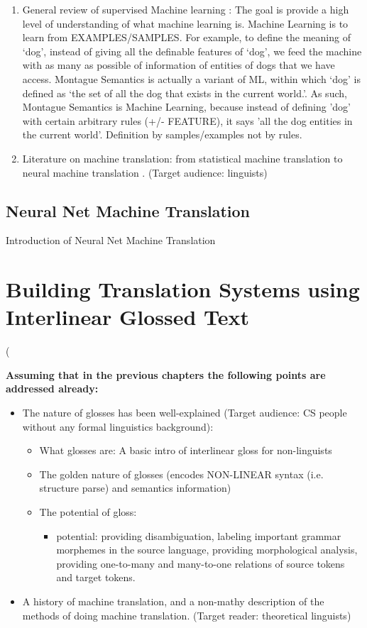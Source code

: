 \documentclass[final]{ua-thesis}
\numberwithin{equation}{section}
\begin{document}
	\begin{enumerate}
	\item General review of supervised Machine learning \citep{kotsiantis2007supervised}: The goal is provide a high level of understanding of what machine learning is. Machine Learning is to learn from EXAMPLES/SAMPLES. For example, to define the meaning of `dog', instead of giving all the definable features of `dog', we feed the machine with as many as possible of information of entities of dogs that we have access. Montague Semantics is actually a variant of ML, within which `dog' is defined as `the set of all the dog that exists in the current world.'. As such, Montague Semantics is Machine Learning, because instead of defining 'dog' with certain arbitrary rules (+/- FEATURE), it says 'all the dog entities in the current world'. Definition by samples/examples not by rules.    
	\item Literature on machine translation: from statistical machine translation \citep{koehn2009statistical} to neural machine translation \citep{cho2014learning,cho2014properties,bahdanau2014neural,Koehn_NMT2017}. (Target audience: linguists)
	\end{enumerate}
 
\section{Neural Net Machine Translation}\label{neural_MT}
Introduction of Neural Net Machine Translation
\chapter{Building Translation Systems using Interlinear Glossed Text}
\label{chap:cake}

(

\textbf{Assuming that in the previous chapters the following points are addressed already:}
\begin{itemize}
\item The nature of glosses has been well-explained  (Target audience: CS people without any formal linguistics background):
	\begin{itemize}
	\item What glosses are: A basic intro of interlinear gloss for non-linguists
   \item The golden nature of glosses (encodes NON-LINEAR syntax (i.e. structure parse) and semantics information)
   \item The potential of gloss:	
		\begin{itemize}
		\item potential: providing disambiguation, labeling important grammar morphemes in the source language, providing morphological analysis, providing one-to-many and many-to-one relations of source tokens and target tokens. 
		\end{itemize}
	\end{itemize}
\item A history of machine translation, and a non-mathy description of the methods of doing machine translation. (Target reader: theoretical linguists)
\end{itemize}
\end{document}
